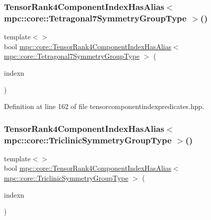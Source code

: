 \subsubsection{\texorpdfstring{Tensor\+Rank4\+Component\+Index\+Has\+Alias$<$ mpc\+::core\+::\+Tetragonal7\+Symmetry\+Group\+Type $>$()}{TensorRank4ComponentIndexHasAlias< mpc::core::Tetragonal7SymmetryGroupType >()}}
{\footnotesize\ttfamily template$<$$>$ \\
bool \mbox{\hyperlink{namespacempc_1_1core_a7242817d0014fa66d25e5cf10a2c4ddf}{mpc\+::core\+::\+Tensor\+Rank4\+Component\+Index\+Has\+Alias}}$<$ \mbox{\hyperlink{structmpc_1_1core_1_1_tetragonal7_symmetry_group_type}{mpc\+::core\+::\+Tetragonal7\+Symmetry\+Group\+Type}} $>$ (\begin{DoxyParamCaption}\item[{const \mbox{\hyperlink{namespacempc_1_1core_a54c081f41b2475abd10182bf023805d2}{mpc\+::core\+::\+Tensor\+Rank4\+Component\+Index}} \&}]{indexn }\end{DoxyParamCaption})\hspace{0.3cm}{\ttfamily [inline]}}



Definition at line 162 of file tensorcomponentindexpredicates.\+hpp.

\mbox{\label{namespacempc_1_1core_a20fb04000260d2acb9517d9004c26a06}} 
\subsubsection{\texorpdfstring{Tensor\+Rank4\+Component\+Index\+Has\+Alias$<$ mpc\+::core\+::\+Triclinic\+Symmetry\+Group\+Type $>$()}{TensorRank4ComponentIndexHasAlias< mpc::core::TriclinicSymmetryGroupType >()}}
{\footnotesize\ttfamily template$<$$>$ \\
bool \mbox{\hyperlink{namespacempc_1_1core_a7242817d0014fa66d25e5cf10a2c4ddf}{mpc\+::core\+::\+Tensor\+Rank4\+Component\+Index\+Has\+Alias}}$<$ \mbox{\hyperlink{structmpc_1_1core_1_1_triclinic_symmetry_group_type}{mpc\+::core\+::\+Triclinic\+Symmetry\+Group\+Type}} $>$ (\begin{DoxyParamCaption}\item[{const \mbox{\hyperlink{namespacempc_1_1core_a54c081f41b2475abd10182bf023805d2}{mpc\+::core\+::\+Tensor\+Rank4\+Component\+Index}} \&}]{indexn }\end{DoxyParamCaption})\hspace{0.3cm}{\ttfamily [inline]}}



